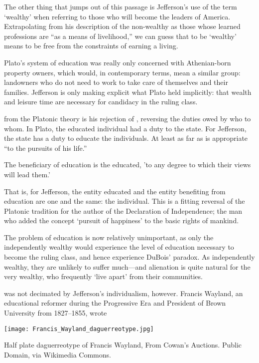 The other thing that jumps out of this passage is Jefferson's use of the term `wealthy' when referring to those who will become the leaders of America. Extrapolating from his description of the non-wealthy as those whose learned professions are ``as a means of livelihood,'' we can guess that to be `wealthy' means to be free from the constraints of earning a living.

Plato's system of education was really only concerned with Athenian-born property owners, which would, in contemporary terms, mean a similar group: landowners who do not need to work to take care of themselves and their families. Jefferson is only making explicit what Plato held implicitly: that wealth and leisure time are necessary for candidacy in the ruling class.

 from the Platonic theory is his rejection of , reversing the duties owed by who to whom. In Plato, the educated individual had a duty to the state. For Jefferson, the state has a duty to educate the individuals. At least as far as is appropriate ``to the pursuits of his life.'' \begin{objects}
\label{jeffersonobjects}The beneficiary of education is the educated, 'to any degree to which their views will lead them.'
\end{objects}


That is, for Jefferson, the entity educated and the entity benefiting from education are one and the same: the individual. This is a fitting reversal of the Platonic tradition for the author of the Declaration of Independence; the man who added the concept `pursuit of happiness' to the basic rights of mankind. 

The problem of education is now relatively unimportant, as only the independently wealthy would experience the level of education necessary to become the ruling class, and hence experience DuBois' paradox. As independently wealthy, they are unlikely to suffer much---and alienation is quite natural for the very wealthy, who frequently `live apart' from their communities.

 was not decimated by Jefferson's individualism, however. Francis Wayland, an educational reformer during the Progressive Era and President of Brown University from 1827--1855, wrote\begin{marginfigure}\texttt{[image: Francis\_Wayland\_daguerreotype.jpg]}\caption{Half plate daguerreotype of Francis Wayland, From Cowan's Auctions. Public Domain, via Wikimedia Commons.}\label{fig:wayland}\end{marginfigure}

